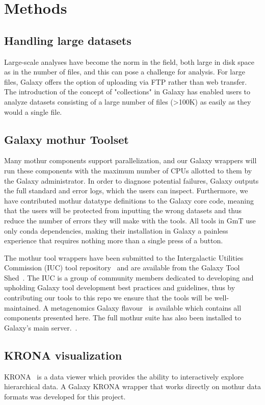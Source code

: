 \section*{Methods}

\subsection*{Handling large datasets}
Large-scale analyses have become the norm in the field, both large in disk space as in the number of files, and this can pose a challenge for analysis. For large files, Galaxy offers the option of uploading via FTP rather than web transfer. The introduction of the concept of "collections" in Galaxy has enabled users to analyze datasets consisting of a large number of files (>100K) as easily as they would a single file.

\subsection*{Galaxy mothur Toolset}
Many mothur components support parallelization, and our Galaxy wrappers will run these components with the maximum number of CPUs allotted to them by the Galaxy administrator. In order to diagnose potential failures, Galaxy outputs the full standard and error logs, which the users can inspect. Furthermore, we have contributed mothur datatype definitions to the Galaxy core code, meaning that the users will be protected from inputting the wrong datasets and thus reduce the number of errors they will make with the tools. All tools in GmT use only conda dependencies, making their installation in Galaxy a painless experience that requires nothing more than a single press of a button.

The mothur tool wrappers have been submitted to the Intergalactic Utilities Commission (IUC) tool repository~\cite{iuc-repo} and are available from the Galaxy Tool Shed~\cite{toolshed}. The IUC is a group of community members dedicated to developing and upholding Galaxy tool development best practices and guidelines, thus by contributing our tools to this repo we ensure that the tools will be well-maintained. A metagenomics Galaxy flavour~\cite{metagenomics-flavour} is available which contains all components presented here. The full mothur suite has also been installed to Galaxy's main server.~\cite{usegalaxy}.

\subsection*{KRONA visualization}
KRONA~\cite{ondov2011interactive} is a data viewer which provides the ability to interactively explore hierarchical data. A Galaxy KRONA wrapper that works directly on mothur data formats was developed for this project.

